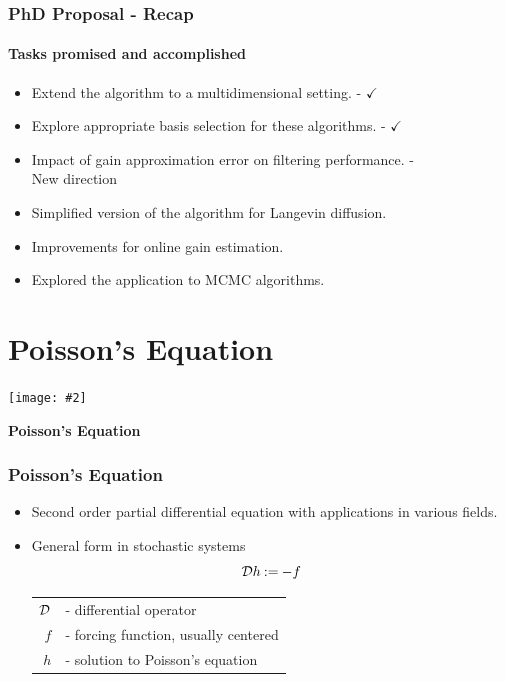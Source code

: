 \documentclass[xcolor=dvipsnames, subsection=false]{beamer}
\def\alertb#1{\alert{\color{BrickRed}  #1}}
\def\alertb#1{\alert{\color{BrickRed}  #1}}
\newcounter{temp}
\newenvironment{framesection}%
{\setcounter{temp}{\value{framenumber}}
\begin{frame}
\thispagestyle{empty}
}%
{\end{frame}\setcounter{framenumber}{\value{temp}}}
\def\Ebox#1#2{%
	\begin{center}
		\texttt{[image: \#2]} %
	\end{center}}
\def\eqdef{\mathbin{:=}}
\def\generate{{\cal D}}
\def\rd#1{{\color{red}#1}}
\def\bl#1{{\color{blue}#1}}
\def\gn#1{{\color{green}#1}}
\begin{document}
\begin{frame}
\frametitle{PhD Proposal - Recap}
\framesubtitle{Tasks promised and accomplished}
\begin{itemize}
\item Extend the algorithm to a multidimensional setting. \pause - \gn{$\checkmark$} 
\item Explore appropriate basis selection for these algorithms. \pause - \gn{$\checkmark$} 
\item Impact of gain approximation error on filtering performance. \pause - \rd{}  \pause \\[0.5cm]
\bl{New direction} \\
\item Simplified version of the algorithm for Langevin diffusion.
\item Improvements for online gain estimation. 
\item Explored the application to MCMC algorithms.
\end{itemize}
\end{frame}

\section{Poisson's Equation}

\begin{framesection}
	
	
	\Ebox{.6}{FishBanner.pdf}
	
	\vfill
	
	\centerline{\Large\bf Poisson's Equation}
	
\end{framesection}


\begin{frame}
\frametitle{Poisson's Equation}
\begin{itemize}
	\item Second order partial differential equation with applications in various fields.
	\item General form in stochastic systems
	{\LARGE
	\[
	\generate h  \eqdef  -f
	\]
    }
	
	
	\begin{tabular}{rl}
$\generate$ & - differential operator\\
$f$ & - forcing function, usually centered\\
$h$ & - solution to \alertb{Poisson's equation}
	\end{tabular}
\end{itemize}
\end{frame}
\end{document}
